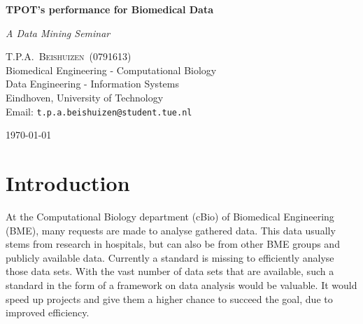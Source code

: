 \documentclass[10pt,a4paper]{article}
\newcommand{\documenttitle}{TPOT's performance for Biomedical Data}
\newcommand{\documentsubtitle}{A Data Mining Seminar}
\begin{document}
	
	\begin{titlepage}
		
		\center
		
		\vspace*{3cm}
		
		\textbf{\huge \documenttitle}
		
		\textit{\LARGE \documentsubtitle}
		
		\vspace*{2cm}
		
		\large
		\centering
		T.P.A.~\textsc{Beishuizen}~(0791613)\\
		Biomedical Engineering - Computational Biology\\
		Data Engineering - Information Systems\\
		Eindhoven, University of Technology\\
		Email: \texttt{t.p.a.beishuizen@student.tue.nl}
		
		\vfill
		
		\vspace*{1cm}
		
		\today
		
	\end{titlepage}
	
	\tableofcontents
	
	
	\pagestyle{fancy}
	\fancyhead{} %
	\fancyfoot{} %
	\renewcommand{\headrulewidth}{0.4pt}
	\renewcommand{\footrulewidth}{0.4pt}
	
	\fancyhead[L]{\rightmark}
	\fancyfoot[C]{\thepage}
	
	
	\clearpage
	
	\section{Introduction}
	\label{sec:Introduction}
	
	At the Computational Biology department (cBio) of Biomedical Engineering (BME), many requests are made to analyse gathered data. This data usually stems from research in hospitals, but can also be from other BME groups and publicly available data. Currently a standard is missing to efficiently analyse those data sets. With the vast number of data sets that are available, such a standard in the form of a framework on data analysis would be valuable. It would speed up projects and give them a higher chance to succeed the goal, due to improved efficiency.
	
\end{document}
